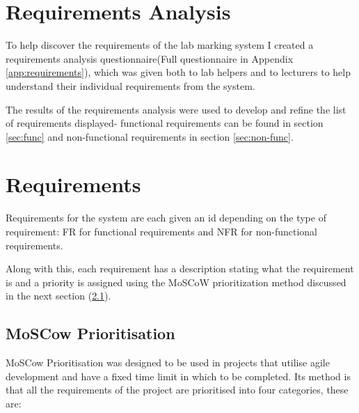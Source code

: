\documentclass[11pt]{report}
\begin{document}
\section{Requirements Analysis}
To help discover the requirements of the lab marking system I created a requirements analysis questionnaire(Full questionnaire in Appendix \ref{app:requirements}), which was given both to lab helpers and to lecturers to help understand their individual requirements from the system. 

The results of the requirements analysis were used to develop and refine the  list of requirements displayed- functional requirements can be found in section \ref{sec:func} and non-functional requirements in section \ref{sec:non-func}.



\section{Requirements}
\label{sec:requirements}
Requirements for the system are each given an id depending on the type of requirement: FR for functional requirements and NFR for non-functional requirements.

Along with this, each requirement has a description stating what the requirement is and a priority is assigned using the MoSCoW prioritization method discussed in the next section (\ref{sec:moscow}).


\subsection{MoSCow Prioritisation}
\label{sec:moscow}

MoSCow Prioritisation \cite{_moscow_2015} was designed to be used in projects that utilise agile development and have a fixed time limit in which to be completed. Its method is that all the requirements of the project are prioritised into four categories, these are:
\end{document}
